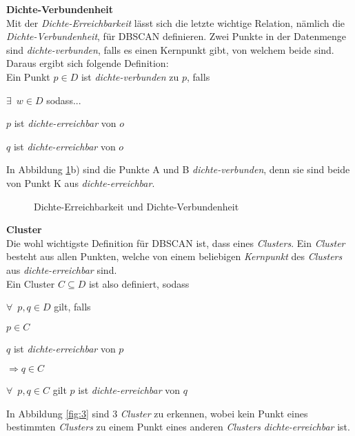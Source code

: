 \documentclass{lni}
\newcommand{\SubItem}[1]{
    {\setlength\itemindent{15pt} \item[-] #1}
}
\begin{document}

\textbf{Dichte-Verbundenheit}\\
Mit der \textit{Dichte-Erreichbarkeit} lässt sich die letzte wichtige Relation, nämlich die \textit{Dichte-Verbundenheit}, für DBSCAN definieren. Zwei Punkte in der Datenmenge sind \textit{dichte-verbunden}, falls es einen Kernpunkt gibt, von welchem beide  sind. Daraus ergibt sich folgende Definition:\\
Ein Punkt $ p \in D $ ist \textit{dichte-verbunden} zu $p$, falls
\begin{itemize}
    \item $\exists\enspace w \in D$ sodass...
        \SubItem{ $p$ ist \textit{dichte-erreichbar} von $o$}
        \SubItem{ $q$ ist \textit{dichte-erreichbar} von $o$}
\end{itemize}
In Abbildung \ref{fig:2}b) sind die Punkte A und B \textit{dichte-verbunden}, denn sie sind beide von Punkt K aus \textit{dichte-erreichbar}.


\begin{figure}[hb]
    \centering
    \subfloat[]{{}}%
    \qquad
    \subfloat[]{{}}
    \caption{Dichte-Erreichbarkeit und Dichte-Verbundenheit}%
    \label{fig:2}%
\end{figure}


\textbf{Cluster}\\
Die wohl wichtigste Definition für DBSCAN ist, dass eines \textit{Clusters}. Ein \textit{Cluster} besteht aus allen Punkten, welche von einem beliebigen \textit{Kernpunkt} des \textit{Clusters} aus \textit{dichte-erreichbar} sind.\\
Ein Cluster $ C \subseteq D $ ist also definiert, sodass
\begin{itemize}
    \item $\forall\enspace p,q \in D$ gilt, falls
        \SubItem{$p \in C$}
        \SubItem{$q$ ist \textit{dichte-erreichbar} von $p$}
    $\Rightarrow q \in C$
    \item $\forall\enspace p,q \in C$ gilt $p$ ist \textit{dichte-erreichbar} von $q$
\end{itemize}
In Abbildung \ref{fig:3} sind 3 \textit{Cluster} zu erkennen, wobei kein Punkt eines bestimmten \textit{Clusters} zu einem Punkt eines anderen \textit{Clusters} \textit{dichte-erreichbar} ist.\\
\end{document}
